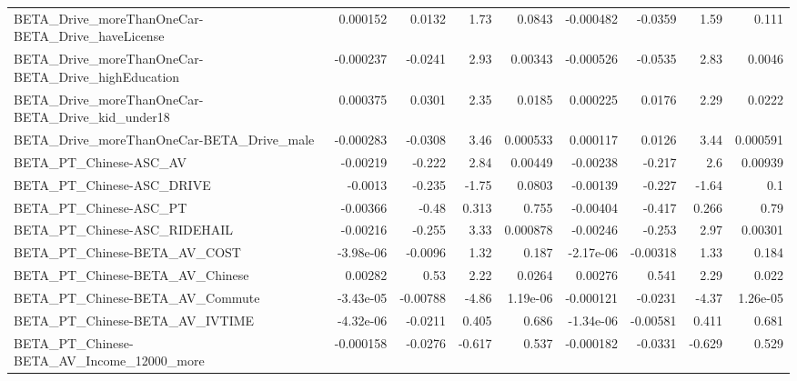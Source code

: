 \begin{tabular}{lrrrrrrrr}
BETA\_Drive\_moreThanOneCar-BETA\_Drive\_haveLicense   &    0.000152 &       0.0132 &      1.73 &   0.0843 &  -0.000482 &     -0.0359 &         1.59 &         0.111 \\
BETA\_Drive\_moreThanOneCar-BETA\_Drive\_highEducation &   -0.000237 &      -0.0241 &      2.93 &  0.00343 &  -0.000526 &     -0.0535 &         2.83 &        0.0046 \\
BETA\_Drive\_moreThanOneCar-BETA\_Drive\_kid\_under18   &    0.000375 &       0.0301 &      2.35 &   0.0185 &   0.000225 &      0.0176 &         2.29 &        0.0222 \\
BETA\_Drive\_moreThanOneCar-BETA\_Drive\_male          &   -0.000283 &      -0.0308 &      3.46 & 0.000533 &   0.000117 &      0.0126 &         3.44 &      0.000591 \\
BETA\_PT\_Chinese-ASC\_AV                             &    -0.00219 &       -0.222 &      2.84 &  0.00449 &   -0.00238 &      -0.217 &          2.6 &       0.00939 \\
BETA\_PT\_Chinese-ASC\_DRIVE                          &     -0.0013 &       -0.235 &     -1.75 &   0.0803 &   -0.00139 &      -0.227 &        -1.64 &           0.1 \\
BETA\_PT\_Chinese-ASC\_PT                             &    -0.00366 &        -0.48 &     0.313 &    0.755 &   -0.00404 &      -0.417 &        0.266 &          0.79 \\
BETA\_PT\_Chinese-ASC\_RIDEHAIL                       &    -0.00216 &       -0.255 &      3.33 & 0.000878 &   -0.00246 &      -0.253 &         2.97 &       0.00301 \\
BETA\_PT\_Chinese-BETA\_AV\_COST                       &   -3.98e-06 &      -0.0096 &      1.32 &    0.187 &  -2.17e-06 &    -0.00318 &         1.33 &         0.184 \\
BETA\_PT\_Chinese-BETA\_AV\_Chinese                    &     0.00282 &         0.53 &      2.22 &   0.0264 &    0.00276 &       0.541 &         2.29 &         0.022 \\
BETA\_PT\_Chinese-BETA\_AV\_Commute                    &   -3.43e-05 &     -0.00788 &     -4.86 & 1.19e-06 &  -0.000121 &     -0.0231 &        -4.37 &      1.26e-05 \\
BETA\_PT\_Chinese-BETA\_AV\_IVTIME                     &   -4.32e-06 &      -0.0211 &     0.405 &    0.686 &  -1.34e-06 &    -0.00581 &        0.411 &         0.681 \\
BETA\_PT\_Chinese-BETA\_AV\_Income\_12000\_more          &   -0.000158 &      -0.0276 &    -0.617 &    0.537 &  -0.000182 &     -0.0331 &       -0.629 &         0.529 \\

\end{tabular}
